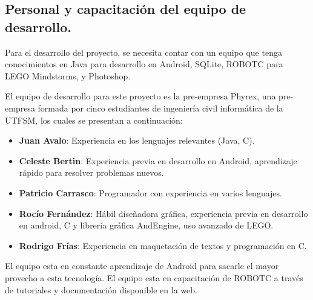 \subsection{Personal y capacitaci\'on del equipo de desarrollo.}

Para el desarrollo del proyecto, se necesita contar con un equipo que tenga conocimientos en Java para desarrollo en Android, SQLite, ROBOTC para LEGO Mindstorms, y Photoshop. 

El equipo de desarrollo para este proyecto es la pre-empresa Phyrex, una pre-empresa formada por cinco estudiantes de ingenier\'ia civil inform\'atica de la UTFSM, los cuales se presentan a continuaci\'on:

\begin{itemize}
\item {\bf Juan Avalo}: Experiencia en los lenguajes relevantes (Java, C). 
\item {\bf Celeste Bertin}: Experiencia previa en desarrollo en Android, aprendizaje r\'apido para resolver problemas nuevos. 
\item {\bf Patricio Carrasco}: Programador con experiencia en varios lenguajes.
\item {\bf Roc\'io Fern\'andez}: H\'abil dise\~nadora gr\'afica, experiencia previa en desarrollo en android, C y librer\'ia gr\'afica AndEngine, uso avanzado de LEGO. 
\item {\bf Rodrigo Fr\'ias}: Experiencia en maquetaci\'on de textos y programaci\'on en C.
\end{itemize}

El equipo esta en constante aprendizaje de Android para sacarle el mayor provecho a esta tecnolog\'ia. El equipo esta en capacitaci\'on de ROBOTC a trav\'es de tutoriales y documentaci\'on disponible en la web. 
